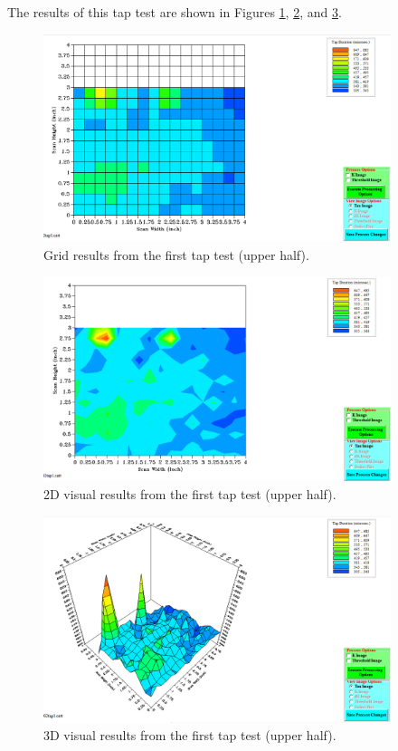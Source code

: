\documentclass[12 pt]{report}
\begin{document}
The results of this tap test are shown in Figures \ref{fig:tt1_grid}, \ref{fig:tt1_2d}, and \ref{fig:tt1_3d}.

\begin{figure}[htbp]
	\centering
	\includegraphics[width=4in]{images/graphs/tap testing/S4G2tap1-grid}
	\caption{Grid results from the first tap test (upper half).}
	\label{fig:tt1_grid}
\end{figure}

\begin{figure}[htbp]
	\centering
	\includegraphics[width=4in]{images/graphs/tap testing/S4G2tap1-2D}
	\caption{2D visual results from the first tap test (upper half).}
	\label{fig:tt1_2d}
\end{figure}

\begin{figure}[htbp]
	\centering
	\includegraphics[width=4in]{images/graphs/tap testing/S4G2tap1-3D}
	\caption{3D visual results from the first tap test (upper half).}
	\label{fig:tt1_3d}
\end{figure}
\end{document}
